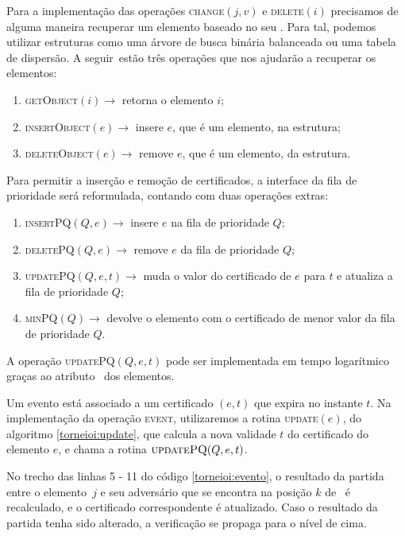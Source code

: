 Para a implementação das operações \textsc{change}$(j, v)$ e
\textsc{delete}$(i)$ precisamos de alguma maneira recuperar um
elemento baseado no seu \id. Para tal, podemos utilizar estruturas
como uma árvore de busca binária balanceada ou uma tabela de
dispersão. A seguir~estão três operações que nos ajudarão a
recuperar os elementos:
\begin{enumerate}
    \item \textsc{getObject}$(i)\rightarrow$ retorna o elemento $i$;
    \item \textsc{insertObject}$(e) \rightarrow$ insere $e$, que é
    um elemento, na estrutura;
    \item \textsc{deleteObject}$(e) \rightarrow$ remove $e$, que é
    um elemento, da estrutura.
\end{enumerate}
Para permitir a inserção e remoção de certificados, a interface da
fila de prioridade será reformulada, contando com duas operações
extras:
\begin{enumerate}
    \item \textsc{insertPQ}$(Q, e) \rightarrow$ insere $e$ na fila
    de prioridade $Q$;
    \item \textsc{deletePQ}$(Q, e) \rightarrow$ remove $e$ da fila
    de prioridade $Q$;
    \item \textsc{updatePQ}$(Q,e,t) \rightarrow$ muda o valor do
    certificado de $e$ para $t$ e atualiza a fila de prioridade $Q$;
    \item \textsc{minPQ}$(Q) \rightarrow$ devolve o elemento com o
    certificado de menor valor da fila de prioridade $Q$.
\end{enumerate}
A operação \textsc{updatePQ}$(Q,e,t)$ pode ser implementada em tempo
logarítmico graças ao atributo \pqpos~dos elementos.

Um evento está associado a um certificado $(e, t)$ que expira no
instante $t$. Na implementação da operação \textsc{event},
utilizaremos a rotina \textsc{update}$(e)$, do algoritmo
\ref{torneioi:update}, que calcula a nova validade $t$ do
certificado do elemento $e$, e chama a rotina $\textsc{updatePQ}(Q,
e, t)$.





No trecho das linhas 5 - 11 do código \ref{torneioi:evento}, o
resultado da partida entre o elemento~$j$ e seu adversário que se
encontra na posição $k$ de \torneio~é recalculado, e o certificado
correspondente é atualizado. Caso o resultado da partida tenha sido
alterado, a verificação se propaga para o nível de cima.

